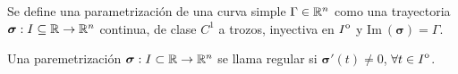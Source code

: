 \begin{definition}
    Se define una parametrizaci\'on de una curva simple $\Gamma\in\mathbb{R}^n$ como una trayectoria $\boldsymbol{\sigma}:I\subseteq\mathbb{R}\to\mathbb{R}^n$ continua, de clase $C^1$ a trozos, inyectiva en ${\kern0ptI}^{\mathrm{o}}$ y $\text{Im}\:(\boldsymbol{\sigma})=\Gamma$.
\end{definition}

\begin{definition}
    Una paremetrizaci\'on $\boldsymbol{\sigma}:I\subset\mathbb{R}\to\mathbb{R}^n$ se llama regular si $\boldsymbol{\sigma}'(t)\neq0$, $\forall t\in{\kern0ptI}^{\mathrm{o}}$.
\end{definition}